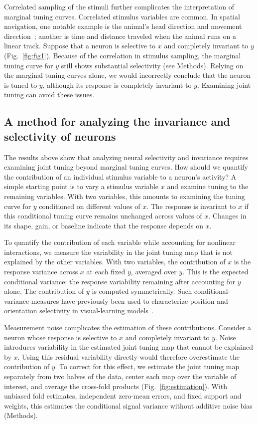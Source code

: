 \documentclass[11pt]{article}
\begin{document}
Correlated sampling of the stimuli further complicates the interpretation of marginal tuning curves. Correlated stimulus variables are common. In spatial navigation, one notable example is the animal's head direction and movement direction~\cite{Raudies2015head}; another is time and distance traveled when the animal runs on a linear track. Suppose that a neuron is selective to $x$ and completely invariant to $y$ (Fig.~\ref{fig:fig1}). Because of the correlation in stimulus sampling, the marginal tuning curve for $y$ still shows substantial selectivity (see Methods). Relying on the marginal tuning curves alone, we would incorrectly conclude that the neuron is tuned to $y$, although its response is completely invariant to $y$. Examining joint tuning can avoid these issues.

\subsection{A method for analyzing the invariance and selectivity of neurons}

The results above show that analyzing neural selectivity and invariance requires examining joint tuning beyond marginal tuning curves. How should we quantify the contribution of an individual stimulus variable to a neuron's activity? A simple starting point is to vary a stimulus variable $x$ and examine tuning to the remaining variables. With two variables, this amounts to examining the tuning curve for $y$ conditioned on different values of $x$. The response is invariant to $x$ if this conditional tuning curve remains unchanged across values of $x$. Changes in its shape, gain, or baseline indicate that the response depends on $x$.

To quantify the contribution of each variable while accounting for nonlinear interactions, we measure the variability in the joint tuning map that is not explained by the other variables. With two variables, the contribution of $x$ is the response variance across $x$ at each fixed $y$, averaged over $y$. This is the expected conditional variance: the response variability remaining after accounting for $y$ alone. The contribution of $y$ is computed symmetrically. Such conditional-variance measures have previously been used to characterize position and orientation selectivity in visual-learning models~\cite{Franzius2007}.

Measurement noise complicates the estimation of these contributions. Consider a neuron whose response is selective to $x$ and completely invariant to $y$. Noise introduces variability in the estimated joint tuning map that cannot be explained by $x$. Using this residual variability directly would therefore overestimate the contribution of $y$. To correct for this effect, we estimate the joint tuning map separately from two halves of the data, center each map over the variable of interest, and average the cross-fold products (Fig.~\ref{fig:estimation}). With unbiased fold estimates, independent zero-mean errors, and fixed support and weights, this estimates the conditional signal variance without additive noise bias (Methods).
\end{document}
